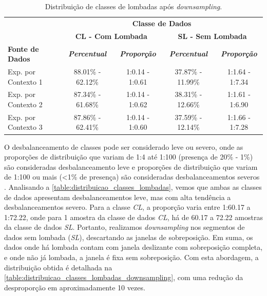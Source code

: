 \begin{table}[h]
\caption{Distribuição de classes de lombadas após \textit{downsampling}.}
\label{table:distribuicao_classes_lombadas_downsampling}
\centering
\scriptsize
\begin{tabular}{lcccc}
\cmidrule(l){2-5}
\multicolumn{1}{c}{\multirow{2}{*}{\textbf{}}} & 
\multicolumn{4}{c}{\textbf{Classe de Dados}} \\ \cmidrule(l){2-5} 
\multicolumn{1}{c}{} & 
\multicolumn{2}{c}{\textbf{CL - Com Lombada}} & 
\multicolumn{2}{c}{\textbf{SL - Sem Lombada}} \\ \midrule
\textbf{Fonte de Dados} & 
\textit{\textbf{Percentual}} & 
\textit{\textbf{Proporção}} & 
\textit{\textbf{Percentual}} & 
\textit{\textbf{Proporção}} \\ \midrule
Exp. por Contexto 1 & 88.01\% - 62.12\% & 1:0.14 - 1:0.61 & 37.87\% - 11.99\% & 1:1.64 - 1:7.34 \\ \midrule
Exp. por Contexto 2 & 87.34\% - 61.68\% & 1:0.14 - 1:0.62 & 38.31\% - 12.66\% & 1:1.61 - 1:6.90 \\ \midrule
Exp. por Contexto 3 & 87.86\% - 62.41\% & 1:0.14 - 1:0.60 & 37.59\% - 12.14\% & 1:1.66 - 1:7.28 \\ \bottomrule
\end{tabular}
\end{table}

O desbalanceamento de classes pode ser considerado leve ou severo, onde as proporções de distribuição que variam de 1:4 até 1:100 (presença de 20\% - 1\%) são consideradas desbalanceamento leve e proporções de distribuição que variam de 1:100 ou mais (<1\% de presença) são consideradas desbalanceamentos severos \cite{Krawczyk2016,Brownlee2020}. Analisando a \autoref{table:distribuicao_classes_lombadas}, vemos que ambas as classes de dados apresentam desbalanceamentos leve, mas com alta tendência a desbalanceamentos severo. Para a classe \emph{CL}, a proporção varia entre 1:60.17 a 1:72.22, onde para 1 amostra da classe de dados \emph{CL}, há de 60.17 a 72.22 amostras da classe de dados \emph{SL}. Portanto, realizamos \textit{downsampling} nos segmentos de dados sem lombada (\emph{SL}), descartando as janelas de sobreposição. Em suma, os dados onde há lombada contam com janela deslizante com sobreposição completa, e onde não já lombada, a janela é fixa sem sobreposição. Com esta abordagem, a distribuição obtida é detalhada na \autoref{table:distribuicao_classes_lombadas_downsampling}, com uma redução da desproporção em aproximadamente 10 vezes.


